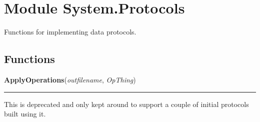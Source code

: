 %
%
%


\section{Module System.Protocols}

    \label{System:Protocols}
Functions for implementing data protocols.



  \subsection{Functions}

    \label{System:Protocols:ApplyOperations}

    \vspace{0.5ex}

\hspace{.8\funcindent}\begin{boxedminipage}{\funcwidth}

    \raggedright \textbf{ApplyOperations}(\textit{outfilename}, \textit{OpThing})

    \vspace{-1.5ex}

    \rule{\textwidth}{0.5\fboxrule}
\setlength{\parskip}{2ex}
    This is deprecated and only kept around to support a couple of initial 
    protocols built using it.

\setlength{\parskip}{1ex}
    \end{boxedminipage}

    \label{System:Protocols:ApplyOperations2}

